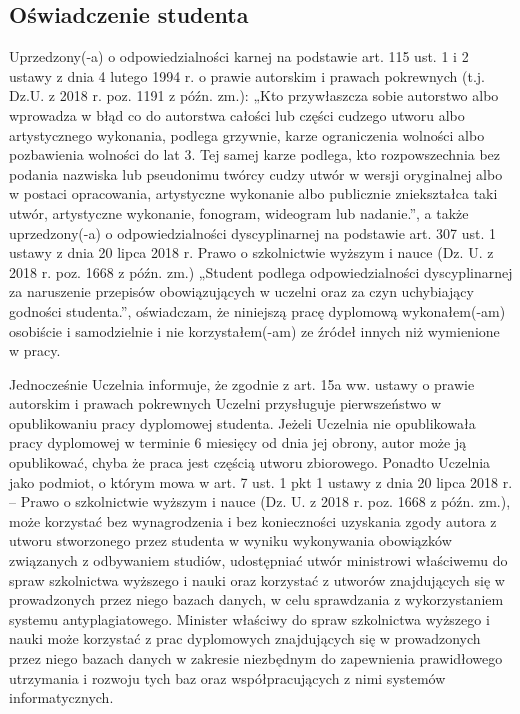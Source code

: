 
\vspace*{2cm}
\begin{addmargin}[1em]{1em}%
\hspace{8mm}
\begin{center}
\subsection*{Oświadczenie studenta}
\end{center}
Uprzedzony(-a) o odpowiedzialności karnej na podstawie art. 115 ust. 1 i 2 ustawy z dnia 4 lutego 1994 r. o prawie autorskim i prawach pokrewnych (t.j. Dz.U. z 2018 r. poz. 1191 z późn. zm.): „Kto przywłaszcza sobie autorstwo albo wprowadza w bł\k{a}d co do autorstwa całości lub części cudzego utworu albo artystycznego wykonania, podlega grzywnie, karze ograniczenia wolności albo pozbawienia wolności do lat 3. Tej samej karze podlega, kto rozpowszechnia bez podania nazwiska lub pseudonimu twórcy cudzy utwór w wersji oryginalnej albo w postaci opracowania, artystyczne wykonanie albo publicznie zniekształca taki utwór, artystyczne wykonanie, fonogram, wideogram lub nadanie.”, a także uprzedzony(-a) o odpowiedzialności dyscyplinarnej na podstawie art. 307 ust. 1 ustawy z dnia 20 lipca 2018 r. Prawo o szkolnictwie wyższym i nauce (Dz. U. z 2018 r. poz. 1668 z późn. zm.) „Student podlega odpowiedzialności dyscyplinarnej za naruszenie przepisów obowi\k{a}zuj\k{a}cych w uczelni oraz za czyn uchybiaj\k{a}cy godności studenta.”, oświadczam, że niniejsz\k{a} pracę dyplomow\k{a} wykonałem(-am) osobiście i samodzielnie i nie korzystałem(-am) ze źródeł innych niż wymienione w pracy. 

\medskip
Jednocześnie Uczelnia informuje, że zgodnie z art. 15a ww. ustawy o prawie autorskim i prawach pokrewnych Uczelni przysługuje pierwszeństwo w opublikowaniu pracy dyplomowej studenta. Jeżeli Uczelnia nie opublikowała pracy dyplomowej w terminie 6 miesięcy od dnia jej obrony, autor może j\k{a} opublikować, chyba że praca jest części\k{a} utworu zbiorowego. Ponadto Uczelnia jako podmiot, o którym mowa w art. 7 ust. 1 pkt 1 ustawy z dnia 20 lipca 2018 r. – Prawo o szkolnictwie wyższym i nauce (Dz. U. z 2018 r. poz. 1668 z późn. zm.), może korzystać bez wynagrodzenia i bez konieczności uzyskania zgody autora z utworu stworzonego przez studenta w wyniku wykonywania obowi\k{a}zków zwi\k{a}zanych z odbywaniem studiów, udostępniać utwór ministrowi właściwemu do spraw szkolnictwa wyższego i nauki oraz korzystać z utworów znajduj\k{a}cych się w prowadzonych przez niego bazach danych, w celu sprawdzania z wykorzystaniem systemu antyplagiatowego. Minister właściwy do spraw szkolnictwa wyższego i nauki może korzystać z prac dyplomowych znajduj\k{a}cych się w prowadzonych przez niego bazach danych w zakresie niezbędnym do zapewnienia prawidłowego utrzymania i rozwoju tych baz oraz współpracuj\k{a}cych z nimi systemów informatycznych. 

\end{addmargin}
\vspace{2cm}

\begin{addmargin}{1em}
\begin{flushright}
\makebox[6cm][s]{\dotfill}\par
{}
\end{flushright}
\end{addmargin}